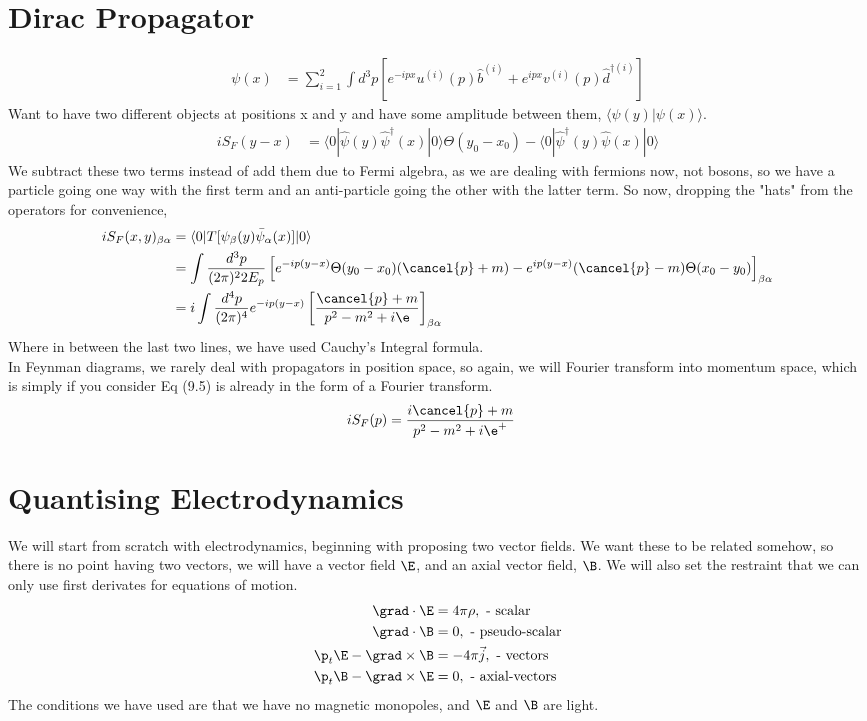 \documentclass[a4paper, 11pt, normalem]{report}
\newcommand\hpsi{\hat{\psi}}
\begin{document}
\section{Dirac Propagator}
\begin{align}
    \psi(x) &= \sum_{i=1}^2 \int d^3p \left[e^{-ipx}u^{(i)}(p)\hat{b}^{(i)} + e^{ipx}v^{(i)}(p)\hat{d}^{\dagger(i)}\right]
\end{align}
Want to have two different objects at positions x and y and have some amplitude between them, $\langle\psi(y)|\psi(x)\rangle$.
\begin{align}
    iS_F(y-x) &= \langle0|\hpsi(y)\hpsi^\dagger(x)|0\rangle\Theta(y_0-x_0) - \langle0|\hpsi^\dagger(y)\hpsi(x)|0\rangle
\end{align}
We subtract these two terms instead of add them due to Fermi algebra, as we are dealing with fermions now, not bosons, so we have a particle going one way with the first term and an anti-particle going the other with the latter term.
So now, dropping the "hats" from the operators for convenience,
\begin{align}
    iS_F(x,y)_{\beta\alpha} &= \langle0|T[\psi_\beta(y)\bar{\psi}_\alpha(x)]|0\rangle \\
                            &= \int \frac{d^3p}{(2\pi)^22E_p}\left[e^{-ip(y-x)}\Theta(y_0-x_0)(\cancel{p}+m) - e^{ip(y-x)}(\cancel{p}-m)\Theta(x_0-y_0)\right]_{\beta\alpha} \\
                            &= i\int\frac{d^4p}{(2\pi)^4} e^{-ip(y-x)}\left[\frac{\cancel{p}+m}{p^2-m^2+i\e}\right]_{\beta\alpha}
\end{align}
Where in between the last two lines, we have used Cauchy's Integral formula.\\
In Feynman diagrams, we rarely deal with propagators in position space, so again, we will Fourier transform into momentum space, which is simply if you consider Eq (9.5) is already in the form of a Fourier transform.
\begin{align}
    iS_F(p) &= \frac{i\cancel{p}+m}{p^2-m^2+i\e^+}
\end{align}

\section{Quantising Electrodynamics}
We will start from scratch with electrodynamics, beginning with proposing two vector fields. 
We want these to be related somehow, so there is no point having two vectors, we will have a vector field $\E$, and an axial vector field, $\B$.
We will also set the restraint that we can only use first derivates for equations of motion. 
\begin{align}
    \grad\cdot\E &= 4\pi\rho, \text{ - scalar} \\
    \grad\cdot\B &= 0, \text{ - pseudo-scalar} \\
    \p_t\E - \grad\times\B &= -4\pi\vec{j}, \text{ - vectors} \\
    \p_t\B - \grad\times\E &= 0, \text{ - axial-vectors}
\end{align}
The conditions we have used are that we have no magnetic monopoles, and $\E$ and $\B$ are light.
\end{document}

